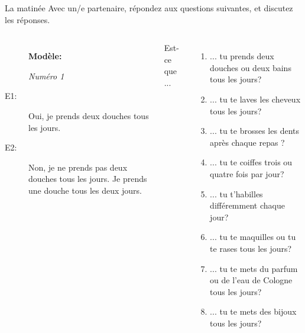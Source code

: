 \documentclass{beamer}
\begin{document}
  \begin{frame}{La matinée}
    \small
    Avec un/e partenaire, répondez aux questions suivantes, et discutez les réponses.
    \begin{columns}
      \scriptsize
        \begin{description}
          \item[] \textbf{Modèle:}
          \item[] \emph{Numéro 1}
          \item[E1:] Oui, je prends deux douches tous les jours.
          \item[] 
          \item[E2:] Non, je ne prends pas deux douches tous les jours. Je prends une douche tous les deux jours.
          \item[] 
        \end{description}
        Est-ce que ...
        \begin{enumerate}
          \item ... tu prends deux douches ou deux bains tous les jours?
          \item ... tu te laves les cheveux tous les jours?
          \item ... tu te brosses les dents après chaque repas ?
          \item ... tu te coiffes trois ou quatre fois par jour?
          \item ... tu t'habilles différemment chaque jour?
          \item ... tu te maquilles ou tu te rases tous les jours?
          \item ... tu te mets du parfum ou de l'eau de Cologne tous les jours?
          \item ... tu te mets des bijoux  tous les jours?
        \end{enumerate}
    \end{columns}
  \end{frame}
\end{document}
